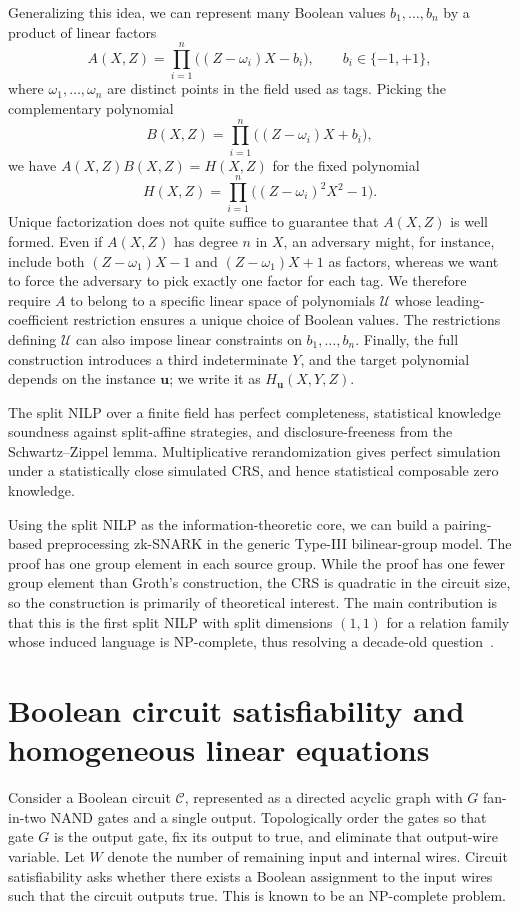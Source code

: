 \documentclass[11pt]{article}
\theoremstyle{definition}
\newcommand{\cC}{\mathcal C}
\newcommand{\cU}{\mathcal U}
\begin{document}
Generalizing this idea, we can represent many Boolean values $b_1,\ldots,b_n$ by a product of linear factors
\[
  A(X,Z)=\prod_{i=1}^n\bigl((Z-\omega_i)X-b_i\bigr),
  \qquad b_i\in\{-1,+1\},
\]
where $\omega_1,\ldots,\omega_n$ are distinct points in the field used as tags. Picking the complementary polynomial
\[
  B(X,Z)=\prod_{i=1}^n\bigl((Z-\omega_i)X+b_i\bigr),
\]
we have $A(X,Z)B(X,Z)=H(X,Z)$ for the fixed polynomial
\[
  H(X,Z)=\prod_{i=1}^n\bigl((Z-\omega_i)^2X^2-1\bigr).
\]
Unique factorization does not quite suffice to guarantee that $A(X,Z)$ is well formed. Even if $A(X,Z)$ has degree $n$ in $X$, an adversary might, for instance, include both $(Z-\omega_1)X-1$ and $(Z-\omega_1)X+1$ as factors, whereas we want to force the adversary to pick exactly one factor for each tag. We therefore require $A$ to belong to a specific linear space of polynomials $\cU$ whose leading-coefficient restriction ensures a unique choice of Boolean values. The restrictions defining $\cU$ can also impose linear constraints on $b_1,\ldots,b_n$. Finally, the full construction introduces a third indeterminate $Y$, and the target polynomial depends on the instance $\mathbf u$; we write it as $H_{\mathbf u}(X,Y,Z)$.

The split NILP over a finite field has perfect completeness, statistical knowledge soundness against split-affine strategies, and disclosure-freeness from the Schwartz--Zippel lemma. Multiplicative rerandomization gives perfect
simulation under a statistically close simulated CRS, and hence statistical
composable zero knowledge.  

Using the split NILP as the information-theoretic core, we can build a pairing-based preprocessing zk-SNARK in the generic Type-III bilinear-group model. The proof has one group element in each source group. While the proof has one fewer group element than Groth's construction, the CRS is quadratic
in the circuit size, so the construction is primarily of theoretical interest.
The main contribution is that this is the first
split NILP with split dimensions $(1,1)$ for a relation family whose induced
language is NP-complete, thus resolving a decade-old question~\cite[Section~1]{Groth16}.


\section{Boolean circuit satisfiability and homogeneous linear equations}
\label{sec:boolean-system}

Consider a Boolean circuit $\cC$, represented as a directed acyclic graph with
$G$ fan-in-two NAND gates and a single output.  Topologically order the gates
so that gate $G$ is the output gate, fix its output to true, and eliminate that
output-wire variable.  Let $W$ denote the number of remaining input and
internal wires.  Circuit satisfiability asks whether there exists a Boolean
assignment to the input wires such that the circuit outputs true.  This is
known to be an NP-complete problem.
\end{document}
